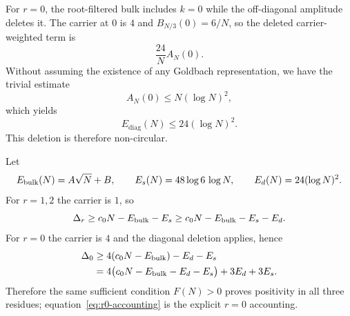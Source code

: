 \documentclass[11pt]{article}
\theoremstyle{definition}
\begin{document}
For $r=0$, the root-filtered bulk includes $k=0$ while the off-diagonal amplitude deletes it. The carrier at $0$ is $4$ and $B_{N/3}(0)=6/N$, so the deleted carrier-weighted term is
\[
\frac{24}{N}A_N(0).
\]
Without assuming the existence of any Goldbach representation, we have the trivial estimate
\[
A_N(0)
\le N(\log N)^2,
\]
which yields
\begin{equation}\label{eq:diag}
\boxed{
E_{\mathrm{diag}}(N)
\le24(\log N)^2.
}
\end{equation}
This deletion is therefore non-circular.

Let
\[
E_{\rm bulk}(N)=A\sqrt N+B,
\qquad
E_s(N)=48\log6\,\log N,
\qquad
E_d(N)=24(\log N)^2.
\]
For $r=1,2$ the carrier is $1$, so
\[
\Delta_r\ge c_0N-E_{\rm bulk}-E_s
\ge c_0N-E_{\rm bulk}-E_s-E_d.
\]
For $r=0$ the carrier is $4$ and the diagonal deletion applies, hence
\begin{align}
\Delta_0
&\ge4(c_0N-E_{\rm bulk})-E_d-E_s\\
&=4\bigl(c_0N-E_{\rm bulk}-E_d-E_s\bigr)+3E_d+3E_s.\label{eq:r0-accounting}
\end{align}
Therefore the same sufficient condition $F(N)>0$ proves positivity in all three residues; equation~\eqref{eq:r0-accounting} is the explicit $r=0$ accounting.
\end{document}
